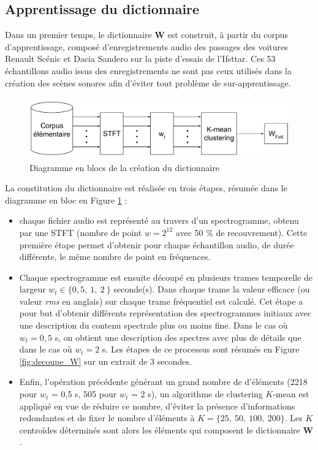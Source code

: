 \subsection{Apprentissage du dictionnaire}

Dans un premier temps, le dictionnaire $\mathbf{W}$ est construit, à partir du corpus d'apprentissage, composé d'enregistrements audio des passages des voitures Renault Scénic et Dacia Sandero sur la piste d'essais de l'Ifsttar. Ces 53 échantillons audio issus des enregistrements ne sont pas ceux utilisés dans la création des scènes sonores afin d'éviter tout problème de sur-apprentissage.

\begin{figure}[hbtp]
\centering
\includegraphics[width=.9\linewidth]{./figures/NMF/creation_dictionaire.pdf}
\caption{Diagramme en blocs de la création du dictionnaire}
\label{fig:creation_W}
\end{figure}


La constitution du dictionnaire est réalisée en trois étapes, résumée dans le diagramme en bloc en Figure \ref{fig:creation_W} : 
\begin{itemize}
\item chaque fichier audio est représenté au travers d'un spectrogramme, obtenu par une STFT (nombre de point $w = 2^{12}$ avec 50 $\%$ de recouvrement). Cette première étape permet d'obtenir pour chaque échantillon audio, de durée différente, le même nombre de point en fréquences.
\item Chaque spectrogramme est ensuite découpé en plusieurs trames temporelle de largeur $w_t \in \lbrace 0,5,~ 1,~ 2~\rbrace$ seconde(s). Dans chaque trame la valeur efficace (ou valeur \textit{rms} en anglais) sur chaque trame fréquentiel est calculé. Cet étape a pour but d'obtenir différents représentation des spectrogrammes initiaux avec une description du contenu spectrale plus ou moins fine. Dans le cas où $w_t = 0,5$ s, on obtient une description des spectres avec plus de détails que dans le cas où $w_t = 2$ s. Les étapes de ce processus sont résumés en Figure \ref{fig:decoupe_W} sur un extrait de 3 secondes.
\item Enfin, l'opération précédente générant un grand nombre de d'éléments (2218 pour $w_t$ = 0,5 s, 505 pour $w_t$ = 2 s), un algorithme de clustering $K$-mean est appliqué en vue de réduire ce nombre, d'éviter la présence d'informations redondantes et de fixer le nombre d'éléments à $K = \lbrace 25,~50,~100,~200 \rbrace$. Les $K$ centroïdes déterminés sont alors les éléments qui composent le dictionnaire $\mathbf{W}$.
\end{itemize}

